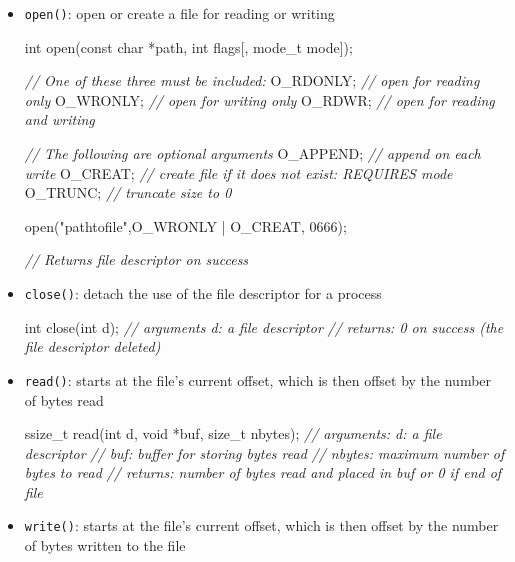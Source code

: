 \documentclass[]{article}
\newenvironment{Shaded}{}{}
\newcommand{\DataTypeTok}[1]{\textcolor[rgb]{0.56,0.13,0.00}{#1}}
\newcommand{\DecValTok}[1]{\textcolor[rgb]{0.25,0.63,0.44}{#1}}
\newcommand{\StringTok}[1]{\textcolor[rgb]{0.25,0.44,0.63}{#1}}
\newcommand{\CommentTok}[1]{\textcolor[rgb]{0.38,0.63,0.69}{\textit{#1}}}
\newcommand{\NormalTok}[1]{#1}
\begin{document}
\begin{itemize}
\item
  \texttt{open()}: open or create a file for reading or writing

\begin{Shaded}
\begin{Highlighting}[]
\DataTypeTok{int}\NormalTok{ open(}\DataTypeTok{const} \DataTypeTok{char}\NormalTok{ *path, }\DataTypeTok{int}\NormalTok{ flags[, mode_t mode]); }

\CommentTok{// One of these three must be included:}
\NormalTok{O_RDONLY; 	}\CommentTok{// open for reading only}
\NormalTok{O_WRONLY; 	}\CommentTok{// open for writing only}
\NormalTok{O_RDWR; 	}\CommentTok{// open for reading and writing}

\CommentTok{// The following are optional arguments}
\NormalTok{O_APPEND; 	}\CommentTok{// append on each write}
\NormalTok{O_CREAT; 	}\CommentTok{// create file if it does not exist: REQUIRES mode}
\NormalTok{O_TRUNC; 	}\CommentTok{// truncate size to 0}

\NormalTok{open(}\StringTok{"pathtofile"}\NormalTok{,O_WRONLY | O_CREAT, }\DecValTok{0666}\NormalTok{);}

\CommentTok{// Returns file descriptor on success}
\end{Highlighting}
\end{Shaded}
\item
  \texttt{close()}: detach the use of the file descriptor for a process

\begin{Shaded}
\begin{Highlighting}[]
\DataTypeTok{int}\NormalTok{ close(}\DataTypeTok{int}\NormalTok{ d);}
\CommentTok{// arguments 	d: a file descriptor }
\CommentTok{// returns:		0 on success (the file descriptor deleted) }
\end{Highlighting}
\end{Shaded}
\item
  \texttt{read()}: starts at the file's current offset, which is then
  offset by the number of bytes read

\begin{Shaded}
\begin{Highlighting}[]
\DataTypeTok{ssize_t}\NormalTok{ read(}\DataTypeTok{int}\NormalTok{ d, }\DataTypeTok{void}\NormalTok{ *buf, }\DataTypeTok{size_t}\NormalTok{ nbytes); }
\CommentTok{// arguments:	d: a file descriptor}
\CommentTok{//				buf: buffer for storing bytes read}
\CommentTok{//				nbytes: maximum number of bytes to read }
\CommentTok{// returns: 	number of bytes read and placed in buf or 0 if end of file }
\end{Highlighting}
\end{Shaded}
\item
  \texttt{write()}: starts at the file's current offset, which is then
  offset by the number of bytes written to the file


\end{itemize}
\end{document}
